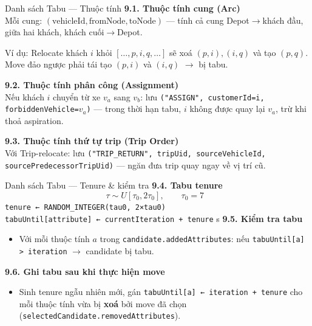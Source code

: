 \documentclass[aspectratio=169]{beamer}
\newcommand{\hl}[1]{\textcolor{blue!60!black}{\textbf{#1}}}
\begin{document}
\begin{frame}{Danh sách Tabu — Thuộc tính}
  \textbf{9.1. Thuộc tính cung (Arc)}\\
  \small Mỗi cung: $(\text{vehicleId}, \text{fromNode}, \text{toNode})$ — tính cả cung Depot$\to$khách đầu, giữa hai khách, khách cuối$\to$Depot.

  \vspace{1mm}
  \small Ví dụ: Relocate khách $i$ khỏi $[\ldots,p,i,q,\ldots]$ sẽ xoá $(p,i),(i,q)$ và tạo $(p,q)$. Move đảo ngược phải tái tạo $(p,i)$ và $(i,q)$ $\to$ bị tabu.

  \vspace{2mm}
  \textbf{9.2. Thuộc tính phân công (Assignment)}\\
  \small Nếu khách $i$ chuyển từ xe $v_a$ sang $v_b$: lưu \texttt{("ASSIGN", customerId=i, forbiddenVehicle=}$v_a$\texttt{)} — trong thời hạn tabu, $i$ không được quay lại $v_a$, trừ khi thoả aspiration.

  \vspace{2mm}
  \textbf{9.3. Thuộc tính thứ tự trip (Trip Order)}\\
  \small Với Trip-relocate: lưu \texttt{("TRIP\_RETURN", tripUid, sourceVehicleId, sourcePredecessorTripUid)} — ngăn đưa trip quay ngay về vị trí cũ.
\end{frame}

\begin{frame}{Danh sách Tabu — Tenure \& kiểm tra}
  \textbf{9.4. Tabu tenure}
  $$\tau \sim U[\tau_0, 2\tau_0], \qquad \tau_0 = 7 \text{ }$$
  \small \texttt{tenure ← RANDOM\_INTEGER(tau0, 2×tau0)}\\
  \small \texttt{tabuUntil[attribute] ← currentIteration + tenure}
s
  \vspace{3mm}
  \textbf{9.5. Kiểm tra tabu}
  \begin{itemize}
    \item \small Với mỗi thuộc tính $a$ trong \texttt{candidate.addedAttributes}: nếu \texttt{tabuUntil[a] > iteration} $\to$ candidate bị tabu.
  \end{itemize}

  \vspace{3mm}
  \textbf{9.6. Ghi tabu sau khi thực hiện move}
  \begin{itemize}
    \item \small Sinh tenure ngẫu nhiên mới, gán \texttt{tabuUntil[a] ← iteration + tenure} cho mỗi thuộc tính vừa bị \hl{xoá} bởi move đã chọn (\texttt{selectedCandidate.removedAttributes}).
  \end{itemize}
\end{frame}
\end{document}

